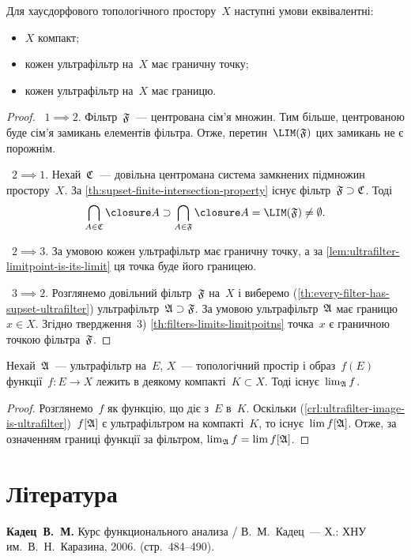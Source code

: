 \begin{theorem}
    Для хаусдорфового топологічного простору~$X$ наступні умови еквівалентні:
    \begin{itemize}
        \item $X$ компакт;
        \item кожен ультрафільтр на~$X$ має граничну точку;
        \item кожен ультрафільтр на~$X$ має границю.
    \end{itemize}
\end{theorem}
\begin{proof}
   ~$1 \implies 2$. Фільтр~$\frak F$~--- центрована сім'я множин. Тим більше, центрованою буде сім'я замикань елементів фільтра. Отже, перетин~$\LIM(\frak F)$ цих замикань не є порожнім. 
    
   ~$2 \implies 1$. Нехай~$\frak C$~--- довільна центромана система замкнених підмножин простору~$X$. За \cref{th:supset-finite-intersection-property} існує фільтр~$\frak F \supset \frak C$. Тоді
    \begin{equation*}
        \bigcap_{A \in \frak C} \closure A \supset \bigcap_{A \in \frak F} \closure A = \LIM(\frak F) \ne \emptyset.
    \end{equation*}
    
   ~$2 \implies 3$. За умовою кожен ультрафільтр має граничну точку, а за \cref{lem:ultrafilter-limitpoint-is-its-limit} ця точка буде його границею. 
    
   ~$3 \implies 2$. Розглянемо довільний фільтр~$\frak F$ на~$X$ і виберемо (\cref{th:every-filter-has-supset-ultrafilter}) ультрафільтр~$\frak A \supset \frak F$. За умовою ультрафільтр~$\frak A$ має границю~$x \in X$. Згідно твердження~3) \cref{th:filters-limits-limitpoitns} точка~$x$ є граничною точкою фільтра~$\frak F$.
\end{proof}

\begin{corollary}
    Нехай~$\frak A$~--- ультрафільтр на~$E$, $X$~--- топологічний простір і образ~$f(E)$ функції~$f: E \to X$ лежить в деякому компакті~$K \subset X$. Тоді існує~$\lim_{\frak A} f$.
\end{corollary}
\begin{proof}
    Розглянемо~$f$ як функцію, що діє з~$E$ в~$K$. Оскільки (\cref{crl:ultrafilter-image-is-ultrafilter})~$f[\frak A]$ є ультрафільтром на компакті~$K$, то існує~$\lim f[\frak A]$. Отже, за означенням границі функції за фільтром, $\lim_{\frak A} f = \lim f[\frak A]$.
\end{proof}

\section{Література}

\begin{enumerate}[label={[\arabic*]}]
\item \textbf{Кадец~В.~М.}
Курс функционального анализа /
В.~М.~Кадец~---
Х.: ХНУ им.~В.~Н.~Каразина, 2006. (стр.~484--490).
\end{enumerate}
